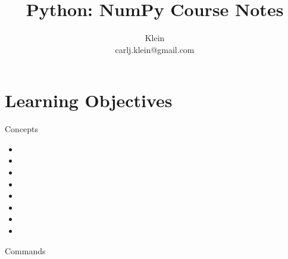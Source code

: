\documentclass{article}
\begin{document}
	\title{Python: NumPy Course Notes}
	\author{Klein \\ carlj.klein@gmail.com}
	\date{}
	\maketitle
	
	\section{Learning Objectives}
	Concepts
	\begin{itemize}
		\item {}
		\item {}
		\item {}
		\item {}
		\item {}
		\item {}
		\item {}
		\item {}
	\end{itemize}
	Commands
\end{document}
